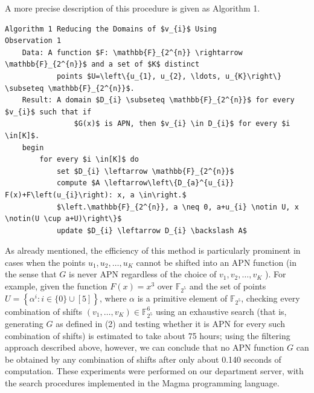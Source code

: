 \documentclass[10pt]{article}
\begin{document}
A more precise description of this procedure is given as Algorithm 1.

\begin{verbatim}
Algorithm 1 Reducing the Domains of $v_{i}$ Using
Observation 1
    Data: A function $F: \mathbb{F}_{2^{n}} \rightarrow \mathbb{F}_{2^{n}}$ and a set of $K$ distinct
            points $U=\left\{u_{1}, u_{2}, \ldots, u_{K}\right\} \subseteq \mathbb{F}_{2^{n}}$.
    Result: A domain $D_{i} \subseteq \mathbb{F}_{2^{n}}$ for every $v_{i}$ such that if
                $G(x)$ is APN, then $v_{i} \in D_{i}$ for every $i \in[K]$.
    begin
        for every $i \in[K]$ do
            set $D_{i} \leftarrow \mathbb{F}_{2^{n}}$
            compute $A \leftarrow\left\{D_{a}^{u_{i}} F(x)+F\left(u_{i}\right): x, a \in\right.$
            $\left.\mathbb{F}_{2^{n}}, a \neq 0, a+u_{i} \notin U, x \notin(U \cup a+U)\right\}$
            update $D_{i} \leftarrow D_{i} \backslash A$
\end{verbatim}

As already mentioned, the efficiency of this method is particularly prominent in cases when the points $u_{1}, u_{2}, \ldots, u_{K}$ cannot be shifted into an APN function (in the sense that $G$ is never APN regardless of the choice of $v_{1}, v_{2}, \ldots, v_{K}$ ). For example, given the function $F(x)=x^{3}$ over $\mathbb{F}_{2^{5}}$ and the set of points $U=\left\{\alpha^{i}: i \in\{0\} \cup[5]\right\}$, where $\alpha$ is a primitive element of $\mathbb{F}_{2^{5}}$, checking every combination of shifts $\left(v_{1}, \ldots, v_{K}\right) \in \mathbb{F}_{2^{5}}^{6}$ using an exhaustive search (that is, generating $G$ as defined in (2) and testing whether it is APN for every such combination of shifts) is estimated to take about 75 hours; using the filtering approach described above, however, we can conclude that no APN function $G$ can be obtained by any combination of shifts after only about 0.140 seconds of computation. These experiments were performed on our department server, with the search procedures implemented in the Magma programming language.
\end{document}
